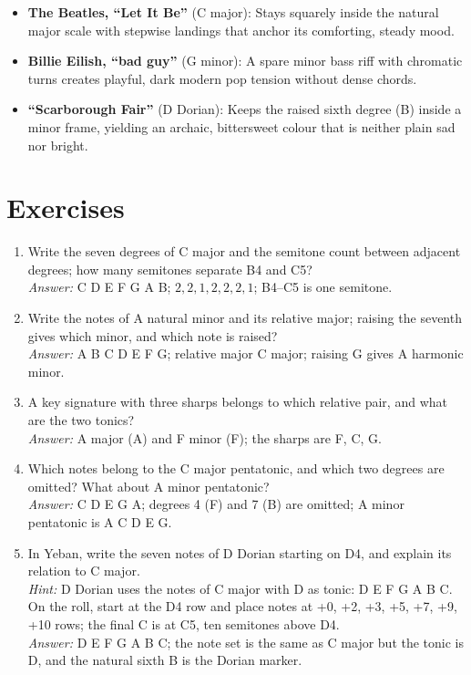 \begin{itemize}
  \item \textbf{The Beatles, ``Let It Be''} (C major): Stays squarely inside the natural major scale with stepwise landings that anchor its comforting, steady mood.
  \item \textbf{Billie Eilish, ``bad guy''} (G minor): A spare minor bass riff with chromatic turns creates playful, dark modern pop tension without dense chords.
  \item \textbf{``Scarborough Fair''} (D Dorian): Keeps the raised sixth degree (B) inside a minor frame, yielding an archaic, bittersweet colour that is neither plain sad nor bright.
\end{itemize}

\section{Exercises}


\begin{exercise}
\begin{enumerate}
  \item Write the seven degrees of C major and the semitone count between adjacent degrees; how many semitones separate B4 and C5?\\
  \emph{Answer:} C D E F G A B; \(2,2,1,2,2,2,1\); B4--C5 is one semitone.

  \item Write the notes of A natural minor and its relative major; raising the seventh gives which minor, and which note is raised?\\
  \emph{Answer:} A B C D E F G; relative major C major; raising G gives A harmonic minor.

  \item A key signature with three sharps belongs to which relative pair, and what are the two tonics?\\
  \emph{Answer:} A major (A) and F\sharpsym{} minor (F\sharpsym); the sharps are F\sharpsym, C\sharpsym, G\sharpsym.

  \item Which notes belong to the C major pentatonic, and which two degrees are omitted? What about A minor pentatonic?\\
  \emph{Answer:} C D E G A; degrees 4 (F) and 7 (B) are omitted; A minor pentatonic is A C D E G.

  \item In Yeban, write the seven notes of D Dorian starting on D4, and explain its relation to C major.\\
  \emph{Hint:} D Dorian uses the notes of C major with D as tonic: D E F G A B C. On the roll, start at the D4 row and place notes at +0, +2, +3, +5, +7, +9, +10 rows; the final C is at C5, ten semitones above D4.\\
  \emph{Answer:} D E F G A B C; the note set is the same as C major but the tonic is D, and the natural sixth B is the Dorian marker.
\end{enumerate}
\end{exercise}

